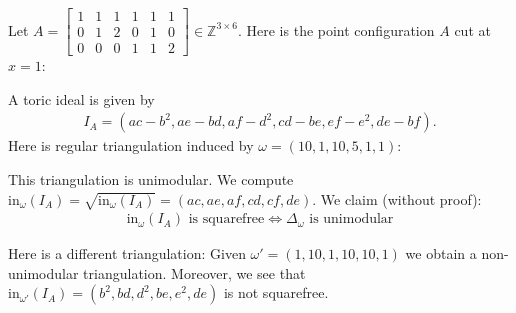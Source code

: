 \documentclass[a4paper, 11pt]{article}
\begin{document}
\begin{eg}
  Let \( A = \begin{bmatrix}
    1 & 1 & 1& 1& 1& 1 \\
    0 & 1 & 2 & 0 & 1 & 0 \\
    0 & 0 & 0 & 1 & 1 & 2
  \end{bmatrix} \in \mathbb Z^{3 \times 6} \). Here is the point configuration \( A \) cut at \( x = 1 \):
  \begin{figure}[H]
    \centering
  \end{figure}
  A toric ideal is given by 
  \begin{align*}
    I_A = (ac - b^2, ae - bd, af - d^2, cd -be, ef - e^2, de -bf).
  \end{align*}
  Here is regular triangulation induced by \( \omega = (10, 1, 10, 5, 1, 1) \):
  \begin{figure}[H]
    \centering
  \end{figure}
  This triangulation is unimodular. We compute \( \mathrm{in}_\omega(I_A) =\sqrt{\mathrm{in}_\omega(I_A)} = (ac, ae, af, cd, cf, de) \). We claim (without proof):
  \begin{align*}
    \mathrm{in}_\omega(I_A) \text{ is squarefree} \iff \Delta_\omega \text{ is unimodular}
  \end{align*}

  Here is a different triangulation:
  Given \( \omega' = (1, 10, 1, 10, 10, 1) \) we obtain a non-unimodular triangulation. Moreover, we see that \( \mathrm{in}_{\omega'}(I_A) = (b^2, bd, d^2, be, e^2, de) \) is not squarefree.


\end{eg}
\end{document}
